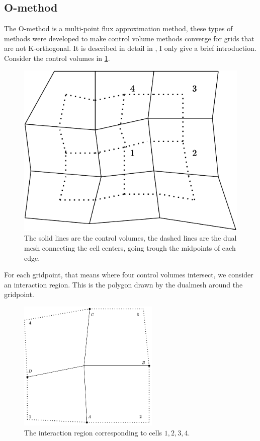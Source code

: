 \documentclass[../Main/main.tex]{subfiles}
\begin{document}
	\subsection*{O-method}
	The O-method is a multi-point flux approximation method, these types of methods were developed to make control volume methods converge for grids that are not K-orthogonal. It is described in detail in  \cite{Aavatsmark2002}, I only give a brief introduction.
	\\
	Consider the control volumes in \ref{fig:dualmesh}.
	\begin{figure}[H]
		\centering
		\includegraphics{dualmesh.pdf}
		
		\caption{The solid lines are the control volumes, the dashed lines are the dual mesh connecting the cell centers, going trough the midpoints of each edge.}
		\label{fig:dualmesh}
	\end{figure}
	For each gridpoint, that means where four control volumes intersect, we consider an interaction region. This is the polygon drawn by the dualmesh around the gridpoint.
	\begin{figure}[H]
		\centering
		\includegraphics[width=0.6\textwidth]{Interaction region.pdf}
		\caption{The interaction region corresponding to cells $1,2,3,4$.}
		\label{fig:interactionregion}
	\end{figure}
\end{document}

